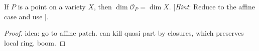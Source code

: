 \label{1.3.12}

If $P$ is a point on a variety $X$, then $\dim \mathcal O_P = \dim X$. [\emph{Hint}: Reduce to the affine case and use \cite[I.3.2c]{hartshorne}].

\begin{proof}
    idea: go to affine patch. can kill quasi part by closures, which preserves local ring. boom.
\end{proof}
